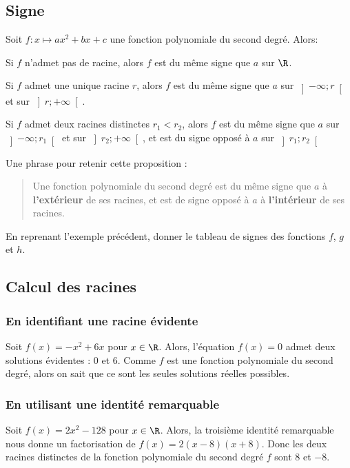 \documentclass{article}
\begin{document}
\subsection{Signe}
\begin{proposition}
Soit $f : x \mapsto ax^2 + bx + c$ une fonction polynomiale du second degré. Alors:
\begin{enumquestions}
\item Si $f$ n'admet pas de racine, alors $f$ est du même signe que $a$ sur $\R$.
\item Si $f$ admet une unique racine $r$, alors $f$ est du même signe que $a$ sur $\left]-\infty;r\right[$ et sur $\left]r;+\infty\right[$.
\item Si $f$ admet deux racines distinctes $r_1 < r_2$, alors $f$ est du même signe que $a$ sur $\left]-\infty;r_1\right[$ et sur $\left]r_2;+\infty\right[$, et est du signe opposé à $a$ sur $\left]r_1;r_2\right[$
\end{enumquestions}
\end{proposition}
\begin{remark}
Une phrase pour retenir cette proposition :
\begin{tcolorbox}
\begin{quote}
Une fonction polynomiale du second degré est du même signe que $a$ à \textbf{l'extérieur} de ses racines, et est de signe opposé à $a$ à \textbf{l'intérieur} de ses racines.
\end{quote}
\end{tcolorbox}
\end{remark}
\begin{example}
En reprenant l'exemple précédent, donner le tableau de signes des fonctions $f$, $g$ et $h$.
\vspace*{0.5cm}

\emptybox{5cm}
\end{example}
\subsection{Calcul des racines}
\subsubsection{En identifiant une racine évidente}
Soit $f(x) = -x^2 + 6x$ pour $x \in \R$. Alors, l'équation $f(x) = 0$ admet deux solutions évidentes : $0$ et $6$. Comme $f$ est une fonction polynomiale du second degré, alors on sait que ce sont les seules solutions réelles possibles.
\subsubsection{En utilisant une identité remarquable}
Soit $f(x)= 2x^2 - 128$ pour $x \in \R$. Alors, la troisième identité remarquable nous donne un factorisation de $f(x) = 2(x - 8)(x + 8)$. Donc les deux racines distinctes de la fonction polynomiale du second degré $f$ sont $8$ et $-8$.
\end{document}
